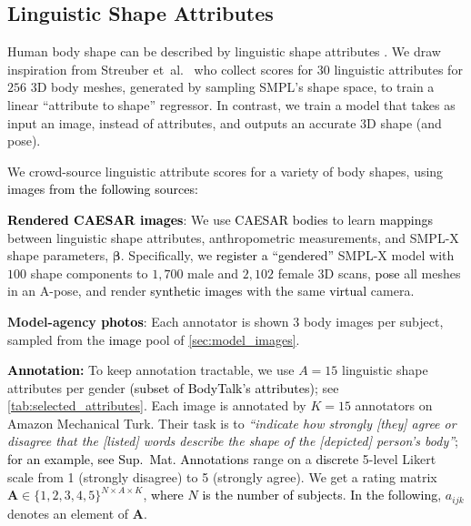 \documentclass[10pt,twocolumn,letterpaper]{article}
\newcommand{\qheading}[1]{\noindent\textbf{#1}:}
\newcommand{\zheading}[1]{\textbf{#1:}}
\newcommand{\numattr}{K}
\newcommand{\apose}{\mbox{A-pose}\xspace}
\newcommand{\threeD}{3D\xspace}
\newcommand{\bodytalk}{\mbox{BodyTalk}\xspace}
\newcommand{\smplx}{\mbox{SMPL-X}\xspace}
\newcommand{\smplX}{\smplx}
\newcommand{\smpl}{\mbox{SMPL}\xspace}
\newcommand{\caesar}{\mbox{CAESAR}\xspace}
\newcommand{\supmat}{{\mbox{\textcolor{black}{Sup.~Mat.}}}\xspace}
\newcommand{\shape}{\bm{\beta}}
\renewcommand{\etal}{\mbox{et al.}\xspace}
\newcommand{\cameraready}[1]{\textcolor{Fuchsia}{{#1}}\xspace}
\renewcommand{\cameraready}[1]{\textcolor{black}{{#1}}\xspace}
\newcommand{\colorTERM}{blue}
\renewcommand{\colorTERM}{black}
\newcommand{\measurements}[0]{{\color{\colorTERM}anthropometric measurements}\xspace}
\newcommand{\linguisticattributes}[0]{{\color{\colorTERM}linguistic attributes}\xspace}
\newcommand{\linguisticshapeattributes}[0]{{\color{\colorTERM}linguistic shape attributes}\xspace}
\newcommand{\LinguisticShapeAttributes}[0]{{\color{\colorTERM}Linguistic Shape Attributes}\xspace}
\newcommand{\scores}[0]{{scores}\xspace}
\newcommand{\linguisticattributescores}[0]{{\color{\colorTERM}linguistic attribute \scores}\xspace}
\begin{document}
\subsection{\LinguisticShapeAttributes} 
\label{sec:attributes}

Human body shape can be described by 
\linguisticshapeattributes 
\cite{hill2015exploring}. 
We draw inspiration from Streuber \etal~\cite{Streuber:SIGGRAPH:2016} who collect \scores for $30$ \linguisticattributes for $256$ \threeD body meshes, generated by sampling \smpl's shape space, to train a linear ``attribute to shape'' regressor. 
In contrast, we train a model that takes as input an image, instead of attributes, and outputs an accurate \threeD shape (and pose). 

We crowd-source \linguisticattributescores for a variety of body shapes, using 
\cameraready{images from the following sources:}

\qheading{\cameraready{Rendered \caesar images}}  \label{sec:caesar_data} 
We use \cameraready{\caesar \cite{CAESAR} bodies} 
to learn \cameraready{mappings} between \linguisticshapeattributes, 
\measurements, 
and \smplX shape parameters, $\shape$.
Specifically, we 
\cameraready{register a ``gendered''} 
\smplx model with $100$ shape components
to $1,700$ male and $2,102$ female \threeD scans,
\cameraready{pose}
all meshes in an \apose, and render \cameraready{synthetic images} with the same 
\cameraready{virtual} camera.

\qheading{Model-agency \cameraready{photos}}
Each annotator is shown $3$ body images per subject, sampled from the \cameraready{image} pool of \cref{sec:model_images}.

\zheading{\cameraready{Annotation}} To keep annotation tractable, 
we use $A=15$ \linguisticshapeattributes per gender \cameraready{(subset of \cameraready{\bodytalk's} \cite{Streuber:SIGGRAPH:2016} attributes)}; see  \cref{tab:selected_attributes}.
Each image is annotated by $\numattr = 15$ annotators on Amazon Mechanical Turk. Their task is to \emph{``indicate how strongly [they] agree or disagree that the [listed] words describe the shape of the [depicted] person's body''}; 
\cameraready{for an example, see \supmat} 
\cameraready{Annotations} 
range on a \cameraready{discrete} 5-level Likert scale from 1 (strongly disagree) to 5 (strongly agree). 
We get a rating matrix $\mathbf{A} \in \{1,2,3,4,5\}^{N \times A \times \numattr}$,
\cameraready{where $N$ is the number of subjects}. 
\cameraready{In the following}, $a_{ijk}$ denotes an element of $\mathbf{A}$. 
\end{document}
